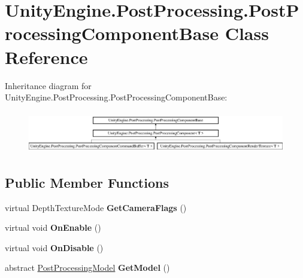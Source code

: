 \hypertarget{class_unity_engine_1_1_post_processing_1_1_post_processing_component_base}{}\section{Unity\+Engine.\+Post\+Processing.\+Post\+Processing\+Component\+Base Class Reference}
\label{class_unity_engine_1_1_post_processing_1_1_post_processing_component_base}
Inheritance diagram for Unity\+Engine.\+Post\+Processing.\+Post\+Processing\+Component\+Base\+:\begin{figure}[H]
\begin{center}
\leavevmode
\includegraphics[height=1.854305cm]{class_unity_engine_1_1_post_processing_1_1_post_processing_component_base}
\end{center}
\end{figure}
\subsection*{Public Member Functions}
\begin{DoxyCompactItemize}
\item 
\mbox{\label{class_unity_engine_1_1_post_processing_1_1_post_processing_component_base_ac381619e1d1a3781fb4183badc0e7b18}} 
virtual Depth\+Texture\+Mode {\bfseries Get\+Camera\+Flags} ()
\item 
\mbox{\label{class_unity_engine_1_1_post_processing_1_1_post_processing_component_base_aff2b95b21422cfffb5a0542d2cd23e08}} 
virtual void {\bfseries On\+Enable} ()
\item 
\mbox{\label{class_unity_engine_1_1_post_processing_1_1_post_processing_component_base_a66da5b84f9e06315b95183a12cc2f10c}} 
virtual void {\bfseries On\+Disable} ()
\item 
\mbox{\label{class_unity_engine_1_1_post_processing_1_1_post_processing_component_base_a83558500b9f9bf231f57bffee50062ea}} 
abstract \mbox{\hyperlink{class_unity_engine_1_1_post_processing_1_1_post_processing_model}{Post\+Processing\+Model}} {\bfseries Get\+Model} ()
\end{DoxyCompactItemize}
